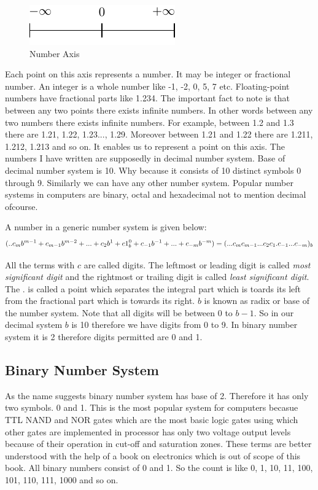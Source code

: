 \begin{figure}[H]
\begin{center}
\includegraphics{figs/ns.pdf}
\end{center}
\caption{Number Axis}
\end{figure}

Each point on this axis represents a number. It may be integer or fractional
number. An integer is a whole number like -1, -2, 0, 5, 7 etc. Floating-point
numbers have fractional parts like 1.234. The important fact to note is that
between any two points there exists infinite numbers. In other words between
any two numbers there exists infinite numbers. For example, between 1.2 and 1.3
there are 1.21, 1.22, 1.23..., 1.29. Moreover between 1.21 and 1.22 there are
1.211, 1.212, 1.213 and so on. It enables us to represent a point on this
axis. The numbers I have written are supposedly in decimal number system. Base
of decimal number system is 10. Why because it consists of 10 distinct symbols
0 through 9. Similarly we can have any other number system. Popular number
systems in computers are binary, octal and hexadecimal not to mention decimal
ofcourse.

A number in a generic number system is given below:
\begin{equation}
(.. c_mb^{m-1} + c_{m-1}b^{m-2}+ ... + c_2b^1 + c1_b^0 + c_{-1}b^{-1} +
... + c_{-m}b^{-m} ) \\ = (... c_mc_{m-1}...c_2c_1.c_{-1}...c_{-m})_b
\end{equation}

All the terms with $c$  are called digits. The leftmost or leading digit is
called \textit{most significant digit} and the rightmost or trailing digit is
called \textit{least significant digit}. The . is called a point which
separates the integral part which is toards its left from the fractional part
which is towards its right. $b$  is known as radix or base of the number
system. Note that all digits will be between $0$ to $b-1$. So in our decimal
system $b$  is 10 therefore we have digits from 0 to 9. In binary number system
it is 2 therefore digits permitted are 0 and 1.

\subsection{Binary Number System}
As the name suggests binary number system has base of 2. Therefore it has only
two symbols. 0 and 1. This is the most popular system for computers becasue TTL
NAND and NOR gates which are the most basic logic gates using which other gates
are implemented in processor has only two voltage output levels because of
their operation in cut-off and saturation zones. These terms are better
understood with the help of a book on electronics which is out of scope of this
book. All binary numbers consist of 0 and 1. So the count is like 0, 1, 10, 11,
100, 101, 110, 111, 1000 and so on.

